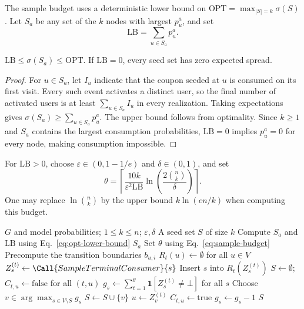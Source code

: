 The sample budget uses a deterministic lower bound on
$\mathrm{OPT}=\max_{|S|=k}\sigma(S)$. Let $S_a$ be any set of
the $k$ nodes with largest $p_u^a$, and set
\begin{equation}
\label{eq:opt-lower-bound}
  \mathrm{LB}=\sum_{u\in S_a}p_u^a.
\end{equation}

\begin{lemma}
\label{lem:lower-bound}
$\mathrm{LB}\le\sigma(S_a)\le\mathrm{OPT}$.
If $\mathrm{LB}=0$, every seed set has zero expected spread.
\end{lemma}
\begin{proof}
For $u\in S_a$, let $I_u$ indicate that the coupon seeded at $u$
is consumed on its first visit. Every such event activates a
distinct user, so the final number of activated users is at least
$\sum_{u\in S_a}I_u$ in every realization.
Taking expectations gives $\sigma(S_a)\ge\sum_{u\in S_a}p_u^a$.
The upper bound follows from optimality. Since $k\ge1$ and $S_a$
contains the largest consumption probabilities, $\mathrm{LB}=0$
implies $p_u^a=0$ for every node, making consumption impossible.
\end{proof}

For $\mathrm{LB}>0$, choose $\varepsilon\in(0,1-1/e)$ and
$\delta\in(0,1)$, and set
\begin{equation}
\label{eq:sample-budget}
 \theta=\left\lceil
 \frac{10k}{\varepsilon^2\mathrm{LB}}
 \ln\left(\frac{2\binom nk}{\delta}\right)
 \right\rceil.
\end{equation}
One may replace $\ln\binom nk$ by the upper bound $k\ln(en/k)$
when computing this budget.

\begin{algorithm}[t]
\caption{\CIMRIS{}: Trajectory Sampling and Coverage Greedy}
\label{alg:cim-ris}
\begin{algorithmic}[1]
\Require $G$ and model probabilities; $1\le k\le n$; $\varepsilon,\delta$
\Ensure A seed set $S$ of size $k$
\State Compute $S_a$ and $\mathrm{LB}$ using Eq.~\eqref{eq:opt-lower-bound}
  \State \Return $S_a$
\EndIf
\State Set $\theta$ using Eq.~\eqref{eq:sample-budget}
\State Precompute the transition boundaries $b_{u,i}$
  \State $R_t(u)\gets\emptyset$ for all $u\in V$
    \State $Z_s^{(t)}\gets\Call{SampleTerminalConsumer}{s}$
      \State Insert $s$ into $R_t(Z_s^{(t)})$
    \EndIf
  \EndFor
\EndFor
\State $S\gets\emptyset$; $C_{t,u}\gets\mathrm{false}$ for all $(t,u)$
\State $g_s\gets\sum_{t=1}^\theta\mathbf1[Z_s^{(t)}\ne\bot]$ for all $s$
  \State Choose $v\in\arg\max_{s\in V\setminus S}g_s$
  \State $S\gets S\cup\{v\}$
    \State $u\gets Z_v^{(t)}$
        \State $C_{t,u}\gets\mathrm{true}$
          \State $g_s\gets g_s-1$
        \EndFor
      \EndIf
    \EndIf
  \EndFor
\EndFor
\State \Return $S$
\end{algorithmic}
\end{algorithm}

